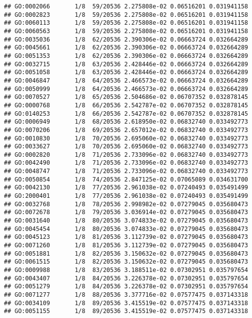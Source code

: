 \documentclass[
]{article}
\begin{document}
\begin{verbatim}
## GO:0002066       1/8  59/20536 2.275808e-02 0.06516201 0.031941158
## GO:0002823       1/8  59/20536 2.275808e-02 0.06516201 0.031941158
## GO:0060113       1/8  59/20536 2.275808e-02 0.06516201 0.031941158
## GO:0060563       1/8  59/20536 2.275808e-02 0.06516201 0.031941158
## GO:0035036       1/8  62/20536 2.390306e-02 0.06663724 0.032664289
## GO:0045661       1/8  62/20536 2.390306e-02 0.06663724 0.032664289
## GO:0051353       1/8  62/20536 2.390306e-02 0.06663724 0.032664289
## GO:0032715       1/8  63/20536 2.428446e-02 0.06663724 0.032664289
## GO:0051058       1/8  63/20536 2.428446e-02 0.06663724 0.032664289
## GO:0046847       1/8  64/20536 2.466573e-02 0.06663724 0.032664289
## GO:0050999       1/8  64/20536 2.466573e-02 0.06663724 0.032664289
## GO:0070527       1/8  65/20536 2.504686e-02 0.06707352 0.032878145
## GO:0000768       1/8  66/20536 2.542787e-02 0.06707352 0.032878145
## GO:0140253       1/8  66/20536 2.542787e-02 0.06707352 0.032878145
## GO:0006949       1/8  68/20536 2.618950e-02 0.06832740 0.033492773
## GO:0070206       1/8  69/20536 2.657012e-02 0.06832740 0.033492773
## GO:0010830       1/8  70/20536 2.695060e-02 0.06832740 0.033492773
## GO:0033627       1/8  70/20536 2.695060e-02 0.06832740 0.033492773
## GO:0002820       1/8  71/20536 2.733096e-02 0.06832740 0.033492773
## GO:0042490       1/8  71/20536 2.733096e-02 0.06832740 0.033492773
## GO:0048747       1/8  71/20536 2.733096e-02 0.06832740 0.033492773
## GO:0050854       1/8  74/20536 2.847125e-02 0.07065089 0.034631700
## GO:0042130       1/8  77/20536 2.961038e-02 0.07240493 0.035491499
## GO:2000401       1/8  77/20536 2.961038e-02 0.07240493 0.035491499
## GO:0032768       1/8  78/20536 2.998982e-02 0.07279045 0.035680473
## GO:0072678       1/8  79/20536 3.036914e-02 0.07279045 0.035680473
## GO:0031640       1/8  80/20536 3.074833e-02 0.07279045 0.035680473
## GO:0045454       1/8  80/20536 3.074833e-02 0.07279045 0.035680473
## GO:0045123       1/8  81/20536 3.112739e-02 0.07279045 0.035680473
## GO:0071260       1/8  81/20536 3.112739e-02 0.07279045 0.035680473
## GO:0051881       1/8  82/20536 3.150632e-02 0.07279045 0.035680473
## GO:0061515       1/8  82/20536 3.150632e-02 0.07279045 0.035680473
## GO:0009988       1/8  83/20536 3.188511e-02 0.07302951 0.035797654
## GO:0043407       1/8  84/20536 3.226378e-02 0.07302951 0.035797654
## GO:0051279       1/8  84/20536 3.226378e-02 0.07302951 0.035797654
## GO:0071277       1/8  88/20536 3.377716e-02 0.07577475 0.037143318
## GO:0034109       1/8  89/20536 3.415519e-02 0.07577475 0.037143318
## GO:0051155       1/8  89/20536 3.415519e-02 0.07577475 0.037143318

\end{verbatim}
\end{document}
